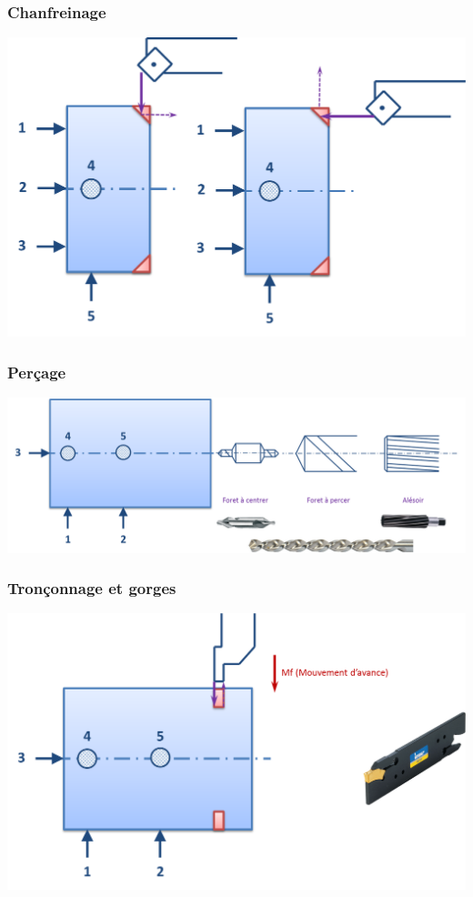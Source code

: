 \documentclass[11pt,oneside]{article}
\begin{document}
\subsubsection{Chanfreinage}
\begin{center}
\includegraphics[width=.7\textwidth]{png/op_chanfrein}
\end{center}
\subsubsection{Perçage}
\begin{center}
\includegraphics[width=.7\textwidth]{png/op_percage}
\end{center}
\subsubsection{Tronçonnage et gorges}
\begin{center}
\includegraphics[width=.7\textwidth]{png/op_gorge}
\end{center}
\end{document}
